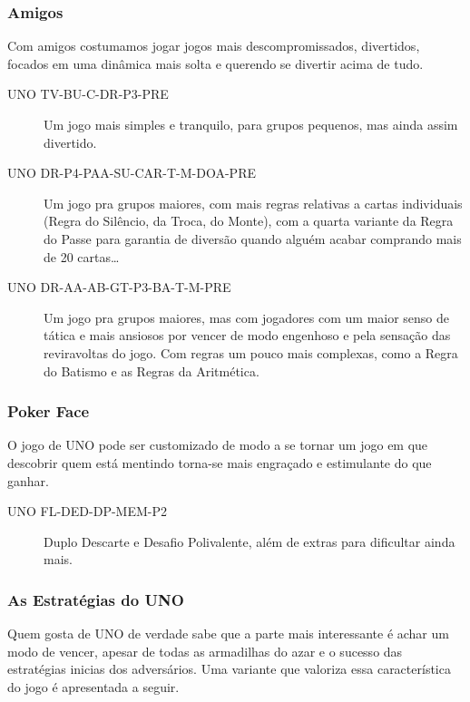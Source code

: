 \subsubsection{Amigos}

Com amigos costumamos jogar jogos mais descompromissados, divertidos, focados em uma dinâmica mais solta e querendo se divertir acima de tudo.

\begin{description}
\item[UNO TV-BU-C-DR-P3-PRE]{Um jogo mais simples e tranquilo, para grupos pequenos, mas ainda assim divertido.}
\item[UNO DR-P4-PAA-SU-CAR-T-M-DOA-PRE]{Um jogo pra grupos maiores, com mais regras relativas a cartas individuais (Regra do Silêncio, da Troca, do Monte), com a quarta variante da Regra do Passe para garantia de diversão quando alguém acabar comprando mais de 20 cartas\ldots}
\item[UNO DR-AA-AB-GT-P3-BA-T-M-PRE]{Um jogo pra grupos maiores, mas com jogadores com um maior senso de tática e mais ansiosos por vencer de modo engenhoso e pela sensação das reviravoltas do jogo. Com regras um pouco mais complexas, como a Regra do Batismo e as Regras da Aritmética.}
\end{description}

\subsubsection{Poker Face}

O jogo de UNO pode ser customizado de modo a se tornar um jogo em que descobrir quem está mentindo torna-se mais engraçado e estimulante do que ganhar.

\begin{description}
\item[UNO FL-DED-DP-MEM-P2]{Duplo Descarte e Desafio Polivalente, além de extras para dificultar ainda mais.}
\end{description}

\subsubsection{As Estratégias do UNO}

Quem gosta de UNO de verdade sabe que a parte mais interessante é achar um modo de vencer, apesar de todas as armadilhas do azar e o sucesso das estratégias inicias dos adversários. Uma variante que valoriza essa característica do jogo é apresentada a seguir.


